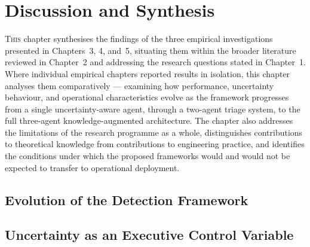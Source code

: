 
\chapter{Discussion and Synthesis}
\label{chap:discussion}

\lettrine{T}{his} chapter synthesises the findings of the three empirical investigations
presented in Chapters~3, 4, and~5, situating them within the broader literature reviewed in
Chapter~2 and addressing the research questions stated in Chapter~1.
Where individual empirical chapters reported results in isolation, this chapter analyses them
comparatively — examining how performance, uncertainty behaviour, and operational
characteristics evolve as the framework progresses from a single uncertainty-aware agent,
through a two-agent triage system, to the full three-agent knowledge-augmented architecture.
The chapter also addresses the limitations of the research programme as a whole, distinguishes
contributions to theoretical knowledge from contributions to engineering practice, and
identifies the conditions under which the proposed frameworks would and would not be expected
to transfer to operational deployment.

\section{Evolution of the Detection Framework}
\label{sec:disc_evolution}


\section{Uncertainty as an Executive Control Variable}
\label{sec:disc_uncertainty}

